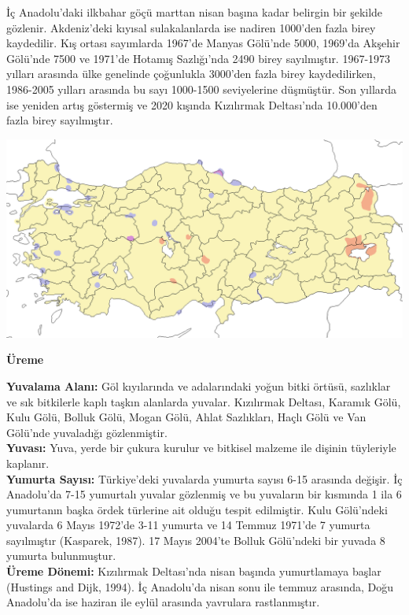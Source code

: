 \documentclass[
  a4paper,
  DIV=11,
  numbers=noendperiod]{scrartcl}
\begin{document}
İç Anadolu'daki ilkbahar göçü marttan nisan başına kadar belirgin bir
şekilde gözlenir. Akdeniz'deki kıyısal sulakalanlarda ise nadiren
1000'den fazla birey kaydedilir. Kış ortası sayımlarda 1967'de Manyas
Gölü'nde 5000, 1969'da Akşehir Gölü'nde 7500 ve 1971'de Hotamış
Sazlığı'nda 2490 birey sayılmıştır. 1967-1973 yılları arasında ülke
genelinde çoğunlukla 3000'den fazla birey kaydedilirken, 1986-2005
yılları arasında bu sayı 1000-1500 seviyelerine düşmüştür. Son yıllarda
ise yeniden artış göstermiş ve 2020 kışında Kızılırmak Deltası'nda
10.000'den fazla birey sayılmıştır.

\includegraphics{images/harita_Mareca strepera.png}

\textbf{Üreme}

\textbf{Yuvalama Alanı:} Göl kıyılarında ve adalarındaki yoğun bitki
örtüsü, sazlıklar ve sık bitkilerle kaplı taşkın alanlarda yuvalar.
Kızılırmak Deltası, Karamık Gölü, Kulu Gölü, Bolluk Gölü, Mogan Gölü,
Ahlat Sazlıkları, Haçlı Gölü ve Van Gölü'nde yuvaladığı gözlenmiştir.\\
\textbf{Yuvası:} Yuva, yerde bir çukura kurulur ve bitkisel malzeme ile
dişinin tüyleriyle kaplanır.\\
\textbf{Yumurta Sayısı:} Türkiye'deki yuvalarda yumurta sayısı 6-15
arasında değişir. İç Anadolu'da 7-15 yumurtalı yuvalar gözlenmiş ve bu
yuvaların bir kısmında 1 ila 6 yumurtanın başka ördek türlerine ait
olduğu tespit edilmiştir. Kulu Gölü'ndeki yuvalarda 6 Mayıs 1972'de 3-11
yumurta ve 14 Temmuz 1971'de 7 yumurta sayılmıştır (Kasparek, 1987). 17
Mayıs 2004'te Bolluk Gölü'ndeki bir yuvada 8 yumurta bulunmuştur.\\
\textbf{Üreme Dönemi:} Kızılırmak Deltası'nda nisan başında yumurtlamaya
başlar (Hustings and Dijk, 1994). İç Anadolu'da nisan sonu ile temmuz
arasında, Doğu Anadolu'da ise haziran ile eylül arasında yavrulara
rastlanmıştır.
\end{document}
